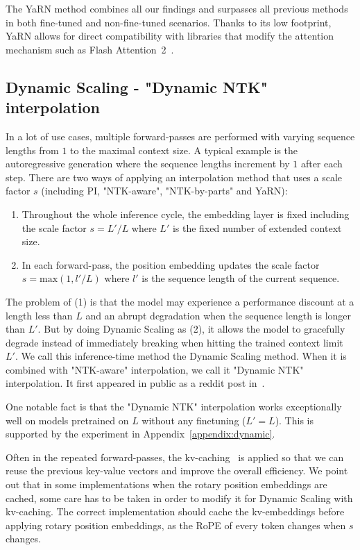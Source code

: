 \documentclass{article} %
\begin{document}
The YaRN method combines all our findings and surpasses all previous methods in both fine-tuned and non-fine-tuned scenarios. Thanks to its low footprint, YaRN allows for direct compatibility with libraries that modify the attention mechanism such as Flash Attention~2~\citep{dao2023flashattention2}.

\subsection{Dynamic Scaling - "Dynamic NTK" interpolation}\label{sec:dynamic}

In a lot of use cases, multiple forward-passes are performed with varying sequence lengths from $1$ to the maximal context size. A typical example is the autoregressive generation where the sequence lengths increment by $1$ after each step. There are two ways of applying an interpolation method that uses a scale factor $s$ (including PI, "NTK-aware", "NTK-by-parts" and YaRN):
\begin{enumerate}
    \item Throughout the whole inference cycle, the embedding layer is fixed including the scale factor $s=L'/L$ where $L'$ is the fixed number of extended context size.
    \item In each forward-pass, the position embedding updates the scale factor $s=\text{max}(1, l'/L)$ where $l'$ is the sequence length of the current sequence.
\end{enumerate}

The problem of (1) is that the model may experience a performance discount at a length less than $L$ and an abrupt degradation when the sequence length is longer than $L'$. But by doing Dynamic Scaling as (2), it allows the model to gracefully degrade instead of immediately breaking when hitting the trained context limit $L'$. We call this inference-time method the Dynamic Scaling method. When it is combined with "NTK-aware" interpolation, we call it "Dynamic NTK" interpolation. It first appeared in public as a reddit post in~\citep{emozillareddit}.

One notable fact is that the "Dynamic NTK" interpolation works exceptionally well on models pretrained on $L$ without any finetuning ($L'=L$). This is supported by the experiment in Appendix~\ref{appendix:dynamic}.

Often in the repeated forward-passes, the kv-caching~\citep{kvcaching} is applied so that we can reuse the previous key-value vectors and improve the overall efficiency. We point out that in some implementations when the rotary position embeddings are cached, some care has to be taken in order to modify it for Dynamic Scaling with kv-caching.
The correct implementation should cache the kv-embeddings before applying rotary position embeddings, as the RoPE of every token changes when $s$ changes.
\end{document}
